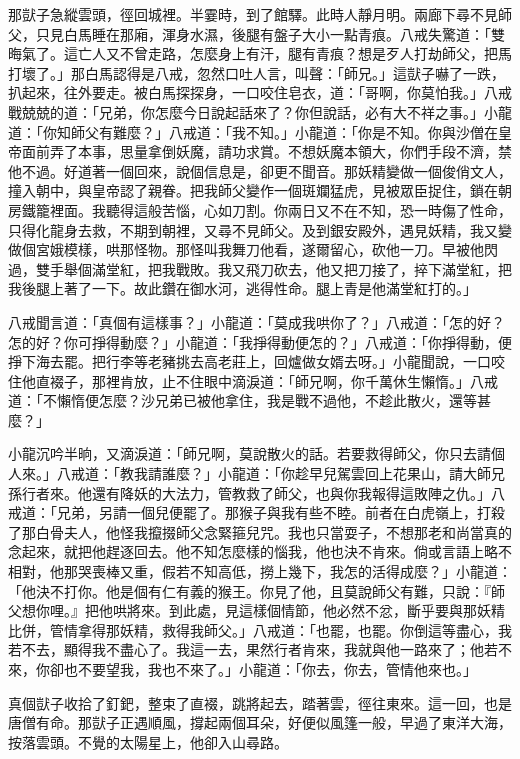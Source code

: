 那獃子急縱雲頭，徑回城裡。半霎時，到了館驛。此時人靜月明。兩廊下尋不見師父，只見白馬睡在那廂，渾身水濕，後腿有盤子大小一點青痕。八戒失驚道：「雙晦氣了。這亡人又不曾走路，怎麼身上有汗，腿有青痕？想是歹人打劫師父，把馬打壞了。」那白馬認得是八戒，忽然口吐人言，叫聲：「師兄。」這獃子嚇了一跌，扒起來，往外要走。被白馬探探身，一口咬住皂衣，道：「哥啊，你莫怕我。」八戒戰兢兢的道：「兄弟，你怎麼今日說起話來了？你但說話，必有大不祥之事。」小龍道：「你知師父有難麼？」八戒道：「我不知。」小龍道：「你是不知。你與沙僧在皇帝面前弄了本事，思量拿倒妖魔，請功求賞。不想妖魔本領大，你們手段不濟，禁他不過。好道著一個回來，說個信息是，卻更不聞音。那妖精變做一個俊俏文人，撞入朝中，與皇帝認了親眷。把我師父變作一個斑斕猛虎，見被眾臣捉住，鎖在朝房鐵籠裡面。我聽得這般苦惱，心如刀割。你兩日又不在不知，恐一時傷了性命，只得化龍身去救，不期到朝裡，又尋不見師父。及到銀安殿外，遇見妖精，我又變做個宮娥模樣，哄那怪物。那怪叫我舞刀他看，遂爾留心，砍他一刀。早被他閃過，雙手舉個滿堂紅，把我戰敗。我又飛刀砍去，他又把刀接了，捽下滿堂紅，把我後腿上著了一下。故此鑽在御水河，逃得性命。腿上青是他滿堂紅打的。」

八戒聞言道：「真個有這樣事？」小龍道：「莫成我哄你了？」八戒道：「怎的好？怎的好？你可掙得動麼？」小龍道：「我掙得動便怎的？」八戒道：「你掙得動，便掙下海去罷。把行李等老豬挑去高老莊上，回爐做女婿去呀。」小龍聞說，一口咬住他直裰子，那裡肯放，止不住眼中滴淚道：「師兄啊，你千萬休生懶惰。」八戒道：「不懶惰便怎麼？沙兄弟已被他拿住，我是戰不過他，不趁此散火，還等甚麼？」

小龍沉吟半晌，又滴淚道：「師兄啊，莫說散火的話。若要救得師父，你只去請個人來。」八戒道：「教我請誰麼？」小龍道：「你趁早兒駕雲回上花果山，請大師兄孫行者來。他還有降妖的大法力，管教救了師父，也與你我報得這敗陣之仇。」八戒道：「兄弟，另請一個兒便罷了。那猴子與我有些不睦。前者在白虎嶺上，打殺了那白骨夫人，他怪我攛掇師父念緊箍兒咒。我也只當耍子，不想那老和尚當真的念起來，就把他趕逐回去。他不知怎麼樣的惱我，他也決不肯來。倘或言語上略不相對，他那哭喪棒又重，假若不知高低，撈上幾下，我怎的活得成麼？」小龍道：「他決不打你。他是個有仁有義的猴王。你見了他，且莫說師父有難，只說：『師父想你哩。』把他哄將來。到此處，見這樣個情節，他必然不忿，斷乎要與那妖精比併，管情拿得那妖精，救得我師父。」八戒道：「也罷，也罷。你倒這等盡心，我若不去，顯得我不盡心了。我這一去，果然行者肯來，我就與他一路來了；他若不來，你卻也不要望我，我也不來了。」小龍道：「你去，你去，管情他來也。」

真個獃子收拾了釘鈀，整束了直裰，跳將起去，踏著雲，徑往東來。這一回，也是唐僧有命。那獃子正遇順風，撐起兩個耳朵，好便似風篷一般，早過了東洋大海，按落雲頭。不覺的太陽星上，他卻入山尋路。


